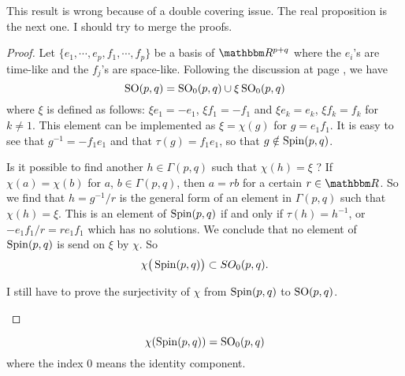 \begin{probleme}
	This result is wrong because of a double covering issue. The real proposition is the next one. I should try to merge the proofs.
\end{probleme}

\begin{proof}
Let $\{ e_1,\cdots,e_p,f_1,\cdots,f_p \}$ be a basis of $\eR^{p+q}$ where the $e_i$'s are time-like and the $f_j$'s are space-like.
Following the discussion at page \pageref{PgDisGeoConnSO}, we have
\[ 
  \operatorname{SO}(p,q)=\operatorname{SO}_0(p,q)\cup\xi \operatorname{SO}_0(p,q)
\]
where $\xi$ is defined as follows: $\xi e_1=-e_1$, $\xi f_1=-f_1$ and $\xi e_k=e_k$, $\xi f_k=f_k$ for $k\neq 1$. This element can be implemented as $\xi=\chi(g)$ for $g=e_1f_1$. It is easy to see that $g^{-1}=-f_1e_1$ and that $\tau(g)=f_1e_1$, so that $g\notin\operatorname{Spin}(p,q)$.

Is it possible to find another $h\in\Gamma(p,q)$ such that $\chi(h)=\xi$ ? If $\chi(a)=\chi(b)$ for $a$, $b\in\Gamma(p,q)$, then $a=rb$ for a certain $r\in\eR$. So we find that $h=g^{-1}/r$ is the general form of an element in $\Gamma(p,q)$ such that $\chi(h)=\xi$. This is an element of $\operatorname{Spin}(p,q)$ if and only if $\tau(h)=h^{-1}$, or $-e_1f_1/r=re_1f_1$ which has no solutions. We conclude that no element of $\operatorname{Spin}(p,q)$ is send on $\xi$ by $\chi$. So
\[ 
  \chi\big( \operatorname{Spin}(p,q) \big)\subset SO_0(p,q).
\]

\begin{probleme}
	I still have to prove the surjectivity of $\chi$ from $\operatorname{Spin}(p,q)$ to $\operatorname{SO}(p,q)$.
\end{probleme}

\end{proof}
\begin{theorem}
\begin{equation}	\label{EqchiSpinSO}	
             \chi(\operatorname{Spin}(p,q))=\operatorname{SO}_0(p,q)
\end{equation} 
where the index $0$ means the identity component.
\end{theorem}

